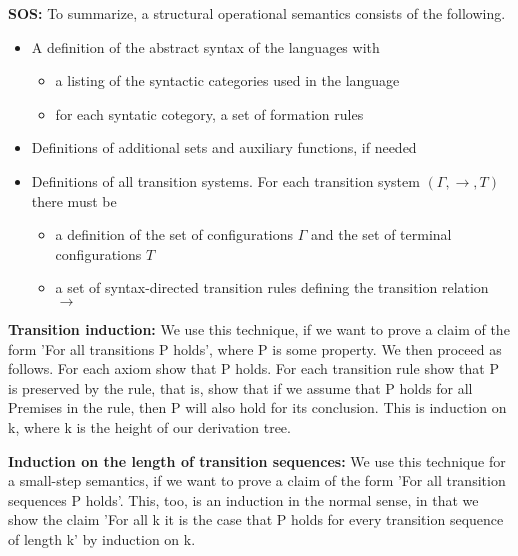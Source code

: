 \documentclass[12pt]{article}
\begin{document}
\textbf{SOS:} To summarize, a structural operational semantics consists of the following.
\begin{itemize}
        \item A definition of the abstract syntax of the languages with
        \begin{itemize}
                \item a listing of the syntactic categories used in the language
                \item for each syntatic cotegory, a set of formation rules
        \end{itemize}
        \item Definitions of additional sets and auxiliary functions, if needed
        \item Definitions of all transition systems. For each transition system $(\Gamma, \rightarrow,T)$ there must be
        \begin{itemize}
                \item a definition of the set of configurations $\Gamma$ and the set of terminal configurations $T$
                \item a set of syntax-directed transition rules defining the transition relation $\rightarrow$
        \end{itemize}
\end{itemize}

\textbf{Transition induction:} We use this technique, if we want to prove a claim of the form 'For all transitions P holds', where P is some property. We then proceed as follows. For each axiom show that P holds. For each transition rule show that P is preserved by the rule, that is, show that if we assume that P holds for all Premises in the rule, then P will also hold for its conclusion. This is induction on k, where k is the height of our derivation tree.

\textbf{Induction on the length of transition sequences:} We use this technique for a small-step semantics, if we want to prove a claim of the form 'For all transition sequences P holds'. This, too, is an induction in the normal sense, in that we show the claim 'For all k it is the case that P holds for every transition sequence of length k' by induction on k.
\end{document}
